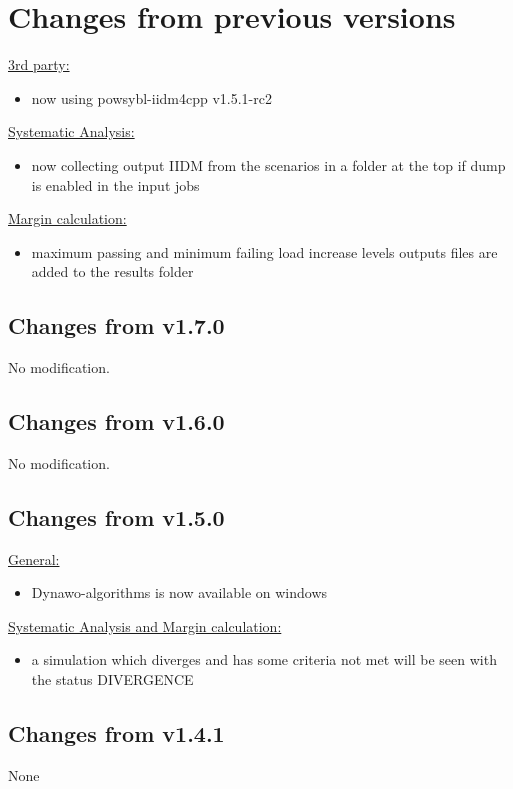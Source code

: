 \documentclass[a4paper, 12pt]{report}
\begin{document}
\section{Changes from previous versions}
\underline{3rd party:}
\begin{itemize}
\item now using powsybl-iidm4cpp v1.5.1-rc2
\end{itemize}

\underline{Systematic Analysis:}
\begin{itemize}
\item now collecting output IIDM from the scenarios in a folder at the top if dump is enabled in the input jobs
\end{itemize}

\underline{Margin calculation:}
\begin{itemize}
\item maximum passing and minimum failing load increase levels outputs files are added to the results folder
\end{itemize}

\subsection{Changes from v1.7.0}
No modification.

\subsection{Changes from v1.6.0}
No modification.

\subsection{Changes from v1.5.0}
\underline{General:}

\begin{itemize}
\item Dynawo-algorithms is now available on windows
\end{itemize}

\underline{Systematic Analysis and Margin calculation:}

\begin{itemize}
\item a simulation which diverges and has some criteria not met will be seen with the status DIVERGENCE
\end{itemize}

\subsection{Changes from v1.4.1}
None
\end{document}
